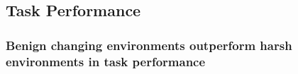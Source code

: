 \documentclass[PhD]{msu-thesis}
\begin{document}











\subsection{Task Performance}

\subsubsection{Benign changing environments outperform harsh environments in task performance}
\end{document}
